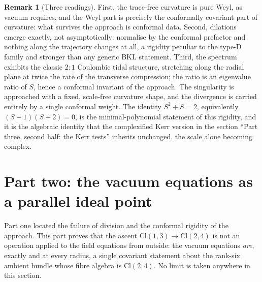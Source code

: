 \documentclass[11pt]{article}
\theoremstyle{definition}
\newtheorem{remark}[theorem]{Remark}
\theoremstyle{plain}
\providecommand{\Cl}{}\renewcommand{\Cl}{\mathrm{Cl}}
\begin{document}
\begin{remark}[Three readings]\label{c:note.interior.three-readings}
First, the trace-free curvature is pure Weyl, as vacuum requires, and the Weyl part is precisely the conformally covariant part of curvature: what survives the approach is conformal data. Second, dilations emerge exactly, not asymptotically: normalise by the conformal prefactor and nothing along the trajectory changes at all, a rigidity peculiar to the type-D family and stronger than any generic BKL statement. Third, the spectrum exhibits the classic $2{:}1$ Coulombic tidal structure, stretching along the radial plane at twice the rate of the transverse compression; the ratio is an eigenvalue ratio of $S$, hence a conformal invariant of the approach. The singularity is approached with a fixed, scale-free curvature shape, and the divergence is carried entirely by a single conformal weight. The identity $S^2 + S = 2$, equivalently $(S-1)(S+2) = 0$, is the minimal-polynomial statement of this rigidity, and it is the algebraic identity that the complexified Kerr version in the section ``Part three, second half: the Kerr tests'' inherits unchanged, the scale alone becoming complex.
\end{remark}

\section{Part two: the vacuum equations as a parallel ideal point}

\label{c:note.interior.setting-part-two-vacuum-equations-parallel}
Part one located the failure of division and the conformal rigidity of the approach. This part proves that the ascent $\Cl(1,3) \to \Cl(2,4)$ is not an operation applied to the field equations from outside: the vacuum equations \emph{are}, exactly and at every radius, a single covariant statement about the rank-six ambient bundle whose fibre algebra is $\Cl(2,4)$. No limit is taken anywhere in this section.
\end{document}
